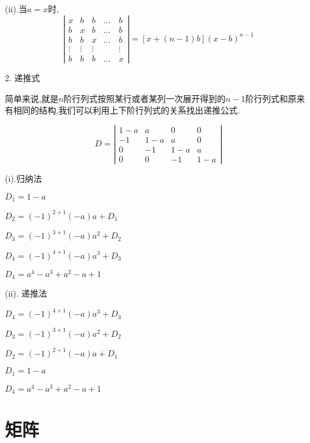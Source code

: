 \begin{theorem}
	(ii).当$a=x$时,
	$$\left|\begin{matrix}
		x&b&b&\dots&b\\
		b&x&b&\dots&b\\
		b&b&x&\dots&b\\
		\vdots&\vdots&\vdots&\quad &\vdots\\
		b&b&b&\dots&x
	\end{matrix} \right|=[x+(n-1)b](x-b)^{n-1}$$
	
	2. 递推式
	
	 简单来说,就是$n$阶行列式按照某行或者某列一次展开得到的$n-1$阶行列式和原来有相同的结构,我们可以利用上下阶行列式的关系找出递推公式.
	 
	 $$D=\left|
	 \begin{matrix}
	 	1-a&a&0&0\\
	 	-1&1-a&a&0\\
	 	0&-1&1-a&a\\
	 	0&0&-1&1-a
	 \end{matrix}
	 \right|$$
	 
	 (i).归纳法
	 
	 $D_{1}=1-a$
	 
	 $D_{2}=(-1)^{2+1}(-a)a+D_{1}$
	 
	 $D_{3}=(-1)^{3+1}(-a)a^2+D_{2}$
	 
	 $D_{4}=(-1)^{4+1}(-a)a^3+D_{3}$
	
	 $D_{4}=a^4-a^3+a^2-a+1$
	 
	 (ii). 递推法
	 
	 $D_{4}=(-1)^{4+1}(-a)a^3+D_{3}$
	 
	 $D_{3}=(-1)^{3+1}(-a)a^2+D_{2}$
	 
	 $D_{2}=(-1)^{2+1}(-a)a+D_{1}$
	  
	 $D_{1}=1-a$
	 
	 $D_{4}=a^4-a^3+a^2-a+1$
	  
\end{theorem}
\chapter{矩阵}
